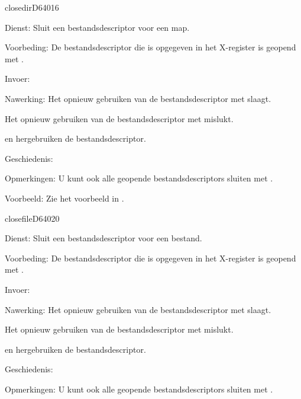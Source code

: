 \newpage
\begin{hyppotrap}{closedir}{D640}{16}

\item [Dienst:]  Sluit een bestandsdescriptor voor een map.
\item [Voorbeding:]  De bestandsdescriptor die is opgegeven in het X-register is geopend met .
\item [Invoer:]  
\item [Nawerking:]  Het opnieuw gebruiken van de bestandsdescriptor met  slaagt.

  Het opnieuw gebruiken van de bestandsdescriptor met  mislukt.

   en  hergebruiken de bestandsdescriptor.\item [Geschiedenis:]

\item [Opmerkingen:]  U kunt ook alle geopende bestandsdescriptors sluiten met .
\item [Voorbeeld:]  Zie het voorbeeld in .
\end{hyppotrap}


\newpage
\begin{hyppotrap}{closefile}{D640}{20}

\item [Dienst:]  Sluit een bestandsdescriptor voor een bestand.
\item [Voorbeding:]  De bestandsdescriptor die is opgegeven in het X-register is geopend met .
\item [Invoer:]  
\item [Nawerking:]  Het opnieuw gebruiken van de bestandsdescriptor met  slaagt.

  Het opnieuw gebruiken van de bestandsdescriptor met  mislukt.

   en  hergebruiken de bestandsdescriptor.\item [Geschiedenis:]
\item [Opmerkingen:]  U kunt ook alle geopende bestandsdescriptors sluiten met .
\end{hyppotrap}


